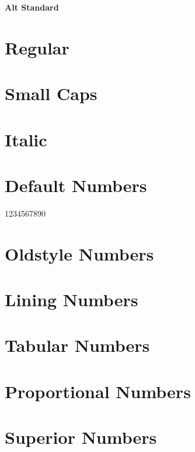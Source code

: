 \documentclass[a4paper]{article}
\begin{document}
\thispagestyle{empty}

\begin{center}\huge\bf Alt Standard
\end{center}


\section*{Regular}
\lipsum[1]

\section*{Small Caps}
\textsc{\lipsum[1]}

\section*{Italic}
\textit{\lipsum[2]}

\section*{Default Numbers}

1234567890

\section*{Oldstyle Numbers}


\section*{Lining Numbers}


\section*{Tabular Numbers}


\section*{Proportional Numbers}


\section*{Superior Numbers}
\end{document}
